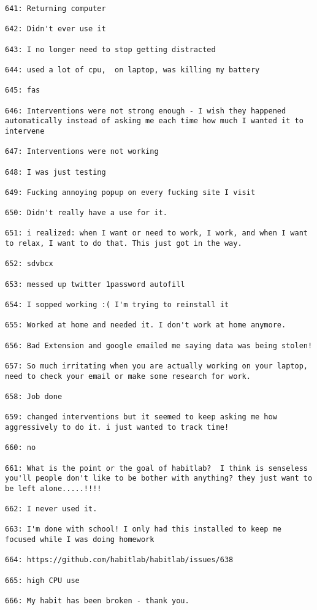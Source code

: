 \begin{lstlisting}[breaklines]
641: Returning computer

642: Didn't ever use it

643: I no longer need to stop getting distracted

644: used a lot of cpu,  on laptop, was killing my battery

645: fas

646: Interventions were not strong enough - I wish they happened automatically instead of asking me each time how much I wanted it to intervene

647: Interventions were not working

648: I was just testing

649: Fucking annoying popup on every fucking site I visit

650: Didn't really have a use for it.

651: i realized: when I want or need to work, I work, and when I want to relax, I want to do that. This just got in the way.

652: sdvbcx

653: messed up twitter 1password autofill

654: I sopped working :( I'm trying to reinstall it

655: Worked at home and needed it. I don't work at home anymore.

656: Bad Extension and google emailed me saying data was being stolen!

657: So much irritating when you are actually working on your laptop, need to check your email or make some research for work.

658: Job done

659: changed interventions but it seemed to keep asking me how aggressively to do it. i just wanted to track time!

660: no

661: What is the point or the goal of habitlab?  I think is senseless you'll people don't like to be bother with anything? they just want to be left alone.....!!!!

662: I never used it.

663: I'm done with school! I only had this installed to keep me focused while I was doing homework

664: https://github.com/habitlab/habitlab/issues/638

665: high CPU use

666: My habit has been broken - thank you.


\end{lstlisting}
